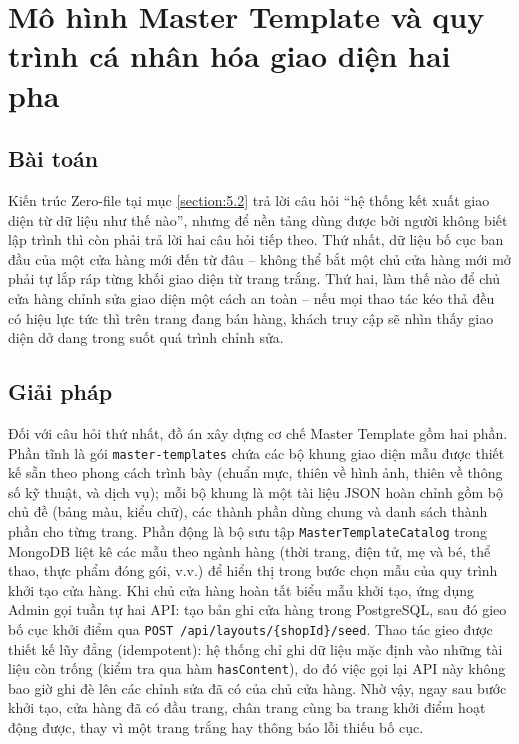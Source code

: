 \documentclass[../main.tex]{subfiles}
\begin{document}
\section{Mô hình Master Template và quy trình cá nhân hóa giao diện hai pha}
\label{section:5.3}

\subsection{Bài toán}
\label{subsection:5.3.1}

Kiến trúc Zero-file tại mục \ref{section:5.2} trả lời câu hỏi ``hệ thống kết xuất giao diện từ dữ liệu như thế nào'', nhưng để nền tảng dùng được bởi người không biết lập trình thì còn phải trả lời hai câu hỏi tiếp theo. Thứ nhất, dữ liệu bố cục ban đầu của một cửa hàng mới đến từ đâu -- không thể bắt một chủ cửa hàng mới mở phải tự lắp ráp từng khối giao diện từ trang trắng. Thứ hai, làm thế nào để chủ cửa hàng chỉnh sửa giao diện một cách an toàn -- nếu mọi thao tác kéo thả đều có hiệu lực tức thì trên trang đang bán hàng, khách truy cập sẽ nhìn thấy giao diện dở dang trong suốt quá trình chỉnh sửa.

\subsection{Giải pháp}
\label{subsection:5.3.2}

Đối với câu hỏi thứ nhất, đồ án xây dựng cơ chế Master Template gồm hai phần. Phần tĩnh là gói \texttt{master-templates} chứa các bộ khung giao diện mẫu được thiết kế sẵn theo phong cách trình bày (chuẩn mực, thiên về hình ảnh, thiên về thông số kỹ thuật, và dịch vụ); mỗi bộ khung là một tài liệu JSON hoàn chỉnh gồm bộ chủ đề (bảng màu, kiểu chữ), các thành phần dùng chung và danh sách thành phần cho từng trang. Phần động là bộ sưu tập \texttt{MasterTemplateCatalog} trong MongoDB liệt kê các mẫu theo ngành hàng (thời trang, điện tử, mẹ và bé, thể thao, thực phẩm đóng gói, v.v.) để hiển thị trong bước chọn mẫu của quy trình khởi tạo cửa hàng. Khi chủ cửa hàng hoàn tất biểu mẫu khởi tạo, ứng dụng Admin gọi tuần tự hai API: tạo bản ghi cửa hàng trong PostgreSQL, sau đó gieo bố cục khởi điểm qua \texttt{POST /api/layouts/\{shopId\}/seed}. Thao tác gieo được thiết kế lũy đẳng (idempotent): hệ thống chỉ ghi dữ liệu mặc định vào những tài liệu còn trống (kiểm tra qua hàm \texttt{hasContent}), do đó việc gọi lại API này không bao giờ ghi đè lên các chỉnh sửa đã có của chủ cửa hàng. Nhờ vậy, ngay sau bước khởi tạo, cửa hàng đã có đầu trang, chân trang cùng ba trang khởi điểm hoạt động được, thay vì một trang trắng hay thông báo lỗi thiếu bố cục.
\end{document}
